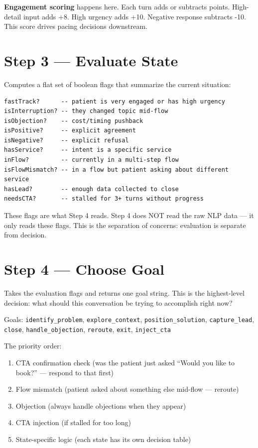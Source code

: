 \documentclass[12pt, a4paper]{report}
\newcommand{\ic}[1]{\texttt{\small\color{accentblue!70!black}#1}}
\begin{document}
\textbf{Engagement scoring} happens here. Each turn adds or subtracts points. High-detail
input adds +8. High urgency adds +10. Negative response subtracts -10. This score drives
pacing decisions downstream.

\section{Step 3 --- Evaluate State}

Computes a flat set of boolean flags that summarize the current situation:

\begin{lstlisting}
fastTrack?      -- patient is very engaged or has high urgency
isInterruption? -- they changed topic mid-flow
isObjection?    -- cost/timing pushback
isPositive?     -- explicit agreement
isNegative?     -- explicit refusal
hasService?     -- intent is a specific service
inFlow?         -- currently in a multi-step flow
isFlowMismatch? -- in a flow but patient asking about different service
hasLead?        -- enough data collected to close
needsCTA?       -- stalled for 3+ turns without progress
\end{lstlisting}

These flags are what Step 4 reads. Step 4 does NOT read the raw NLP data --- it only
reads these flags. This is the separation of concerns: evaluation is separate from
decision.

\section{Step 4 --- Choose Goal}

Takes the evaluation flags and returns one goal string. This is the highest-level
decision: what should this conversation be trying to accomplish right now?

Goals: \ic{identify\_problem}, \ic{explore\_context}, \ic{position\_solution},
\ic{capture\_lead}, \ic{close}, \ic{handle\_objection}, \ic{reroute}, \ic{exit},
\ic{inject\_cta}

The priority order:
\begin{enumerate}
  \item CTA confirmation check (was the patient just asked ``Would you like to book?''
        --- respond to that first)
  \item Flow mismatch (patient asked about something else mid-flow --- reroute)
  \item Objection (always handle objections when they appear)
  \item CTA injection (if stalled for too long)
  \item State-specific logic (each state has its own decision table)
\end{enumerate}
\end{document}
